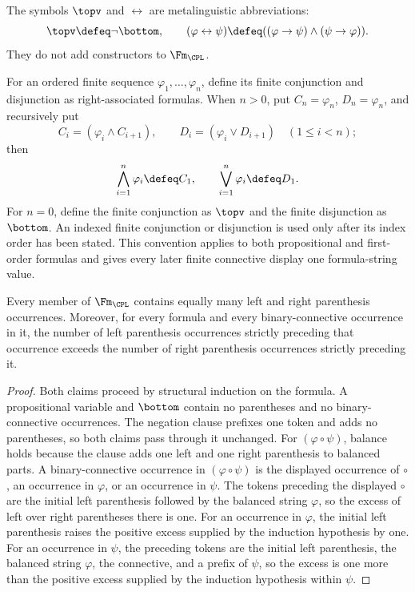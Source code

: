 \begin{definition}
The symbols \(\topv\) and \(\leftrightarrow\) are metalinguistic
abbreviations:
\[
  \topv\defeq\neg\bottom,
  \qquad
  (\varphi\leftrightarrow\psi)
  \defeq((\varphi\to\psi)\land(\psi\to\varphi)).
\]
They do not add constructors to \(\Fm_{\CPL}\).
\end{definition}

For an ordered finite sequence \(\varphi_1,\ldots,\varphi_n\), define its
finite conjunction and disjunction as right-associated formulas.  When
\(n>0\), put \(C_n=\varphi_n\), \(D_n=\varphi_n\), and recursively put
\[
 C_i=(\varphi_i\land C_{i+1}),
 \qquad
 D_i=(\varphi_i\lor D_{i+1})
 \quad(1\leq i<n);
\]
then
\[
 \bigwedge_{i=1}^{n}\varphi_i\defeq C_1,
 \qquad
 \bigvee_{i=1}^{n}\varphi_i\defeq D_1.
\]
For \(n=0\), define the finite conjunction as \(\topv\) and the finite
disjunction as \(\bottom\).  An indexed finite conjunction or disjunction is
used only after its index order has been stated.  This convention applies to
both propositional and first-order formulas and gives every later finite
connective display one formula-string value.

\begin{lemma}
\label{lem:paren-count}
Every member of \(\Fm_{\CPL}\) contains equally many left and right
parenthesis occurrences.  Moreover, for every formula and every
binary-connective occurrence in it, the number of left parenthesis
occurrences strictly preceding that occurrence exceeds the number of right
parenthesis occurrences strictly preceding it.
\end{lemma}
\begin{proof}
Both claims proceed by structural induction on the formula.  A propositional
variable and \(\bottom\) contain no parentheses and no binary-connective
occurrences.  The negation clause prefixes one token and adds no
parentheses, so both claims pass through it unchanged.  For
\((\varphi\circ\psi)\), balance holds because the clause adds one left and
one right parenthesis to balanced parts.  A binary-connective occurrence in
\((\varphi\circ\psi)\) is the displayed occurrence of \(\circ\), an
occurrence in \(\varphi\), or an occurrence in \(\psi\).  The tokens
preceding the displayed \(\circ\) are the initial left parenthesis followed
by the balanced string \(\varphi\), so the excess of left over right
parentheses there is one.  For an occurrence in \(\varphi\), the initial
left parenthesis raises the positive excess supplied by the induction
hypothesis by one.  For an occurrence in \(\psi\), the preceding tokens are
the initial left parenthesis, the balanced string \(\varphi\), the
connective, and a prefix of \(\psi\), so the excess is one more than the
positive excess supplied by the induction hypothesis within \(\psi\).
\end{proof}

